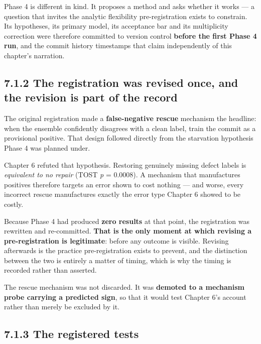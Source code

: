 Phase 4 is different in kind. It proposes a method and asks whether it
works --- a question that invites the analytic flexibility
pre-registration exists to constrain. Its hypotheses, its primary model,
its acceptance bar and its multiplicity correction were therefore
committed to version control \textbf{before the first Phase 4 run}, and
the commit history timestamps that claim independently of this chapter's
narration.

\subsection{7.1.2 The registration was revised once, and the revision is
part of the
record}\label{the-registration-was-revised-once-and-the-revision-is-part-of-the-record}

The original registration made a \textbf{false-negative rescue}
mechanism the headline: when the ensemble confidently disagrees with a
clean label, train the commit as a provisional positive. That design
followed directly from the starvation hypothesis Phase 4 was planned
under.

Chapter 6 refuted that hypothesis. Restoring genuinely missing defect
labels is \emph{equivalent to no repair} (TOST \emph{p} = 0.0008). A
mechanism that manufactures positives therefore targets an error shown
to cost nothing --- and worse, every incorrect rescue manufactures
exactly the error type Chapter 6 showed to be costly.

Because Phase 4 had produced \textbf{zero results} at that point, the
registration was rewritten and re-committed. \textbf{That is the only
moment at which revising a pre-registration is legitimate}: before any
outcome is visible. Revising afterwards is the practice pre-registration
exists to prevent, and the distinction between the two is entirely a
matter of timing, which is why the timing is recorded rather than
asserted.

The rescue mechanism was not discarded. It was \textbf{demoted to a
mechanism probe carrying a predicted sign}, so that it would test
Chapter 6's account rather than merely be excluded by it.

\subsection{7.1.3 The registered tests}\label{the-registered-tests}

